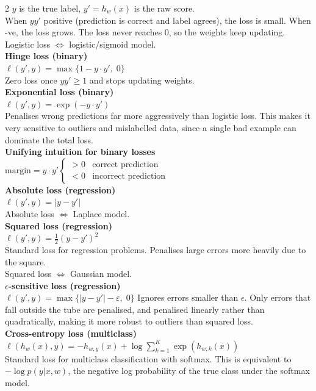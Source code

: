 \documentclass[10pt]{article}
\begin{document}
\begin{multicols*}{2}
$y$ is the true label, $y' = h_w(x)$ is the raw score.\\
When $yy'$ positive (prediction is correct and label agrees), the loss is small. When -ve, the loss grows. The loss never reaches 0, so the weights keep updating.\\
Logistic loss $\iff$ logistic/sigmoid model.\\
\textbf{Hinge loss (binary)}\\
$\ell(y', y) = \max\{1 - y \cdot y', \; 0\}$\\
Zero loss once $yy'\geq 1$ and stops updating weights.\\
\textbf{Exponential loss (binary)}\\
$\ell(y', y) = \exp(-y \cdot y')$\\
Penalises wrong predictions far more aggressively than logistic loss.
This makes it very sensitive to outliers and mislabelled data, since a single bad example can dominate the total loss.\\
\textbf{Unifying intuition for binary losses}
$\text{margin} = y \cdot y'
\begin{cases} > 0 & \text{correct prediction} \\ < 0 & \text{incorrect prediction} \end{cases}$\\
\textbf{Absolute loss (regression)}\\
$\ell(y', y) = |y - y'|$\\
Absolute loss $\iff$ Laplace model.\\
\textbf{Squared loss (regression)}\\
$\ell(y', y) = \frac{1}{2}(y - y')^2$\\
Standard loss for regression problems.
Penalises large errors more heavily due to the square.\\
Squared loss $\iff$ Gaussian model.\\
$\epsilon$\textbf{-sensitive loss (regression)}\\ 
$\ell(y', y) = \max\{|y - y'| - \varepsilon, \; 0\}$
Ignores errors smaller than $\epsilon$.
Only errors that fall outside the tube are penalised, and penalised linearly rather than quadratically, making it more robust to outliers than squared loss.\\
\textbf{Cross-entropy loss (multiclass)}
$\ell(h_w(x), y) = -h_{w,y}(x) + \log \sum_{k=1}^{K} \exp(h_{w,k}(x))$\\
Standard loss for multiclass classification with softmax.
This is equivalent to $-\log p(y | x, w)$, the negative log probability of the true class under the softmax model.\\

\end{multicols*}
\end{document}
